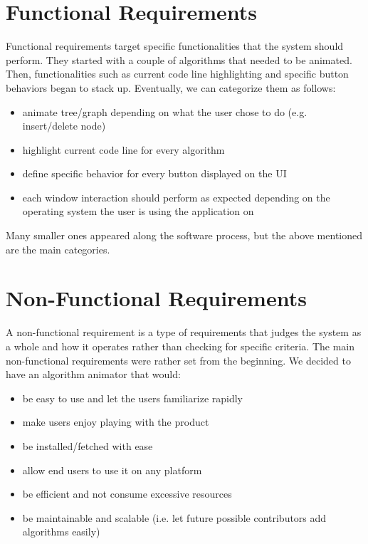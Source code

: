 \documentclass{l4proj}
\begin{document}
\section{Functional Requirements}

Functional requirements target specific functionalities that the system should perform. They started with a couple of algorithms that needed to be animated. Then, functionalities such as current code line highlighting and specific button behaviors began to stack up. Eventually, we can categorize them as follows:

\begin{itemize}
\item animate tree/graph depending on what the user chose to do (e.g. insert/delete node)
\item highlight current code line for every algorithm
\item define specific behavior for every button displayed on the UI
\item each window interaction should perform as expected depending on the operating system the user is using the application on
\end{itemize}

Many smaller ones appeared along the software process, but the above mentioned are the main categories.

\section{Non-Functional Requirements}

A non-functional requirement is a type of requirements that judges the system as a whole and how it operates rather than checking for specific criteria. The main non-functional requirements were rather set from the beginning. We decided to have an algorithm animator that would:

\begin{itemize}
\item be easy to use and let the users familiarize rapidly
\item make users enjoy playing with the product
\item be installed/fetched with ease
\item allow end users to use it on any platform
\item be efficient and not consume excessive resources
\item be maintainable and scalable (i.e. let future possible contributors add algorithms easily)
\end{itemize}
\end{document}
